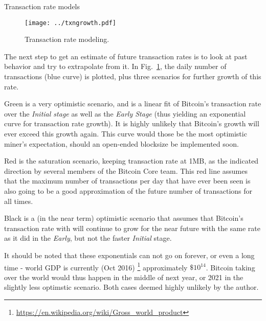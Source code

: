 \documentclass{article}
\begin{document}
\begin{section}{Transaction rate models}
  \begin{figure}[h]
    \texttt{[image: ../txngrowth.pdf]}
    \caption{Transaction rate modeling. \label{fig:txngrowth}}
  \end{figure}
  
  The next step to get an estimate of future transaction rates is to look at
  past behavior and try to extrapolate from it. In Fig.~\ref{fig:txngrowth},
  the daily number of transactions (blue curve) is plotted, plus three
  scenarios for further growth of this rate.

  Green is a very optimistic scenario, and is a linear fit of Bitcoin's
  transaction rate over the \emph{Initial stage} as well as the
  \emph{Early Stage} (thus yielding an exponential curve for transaction rate
  growth). It is highly unlikely that Bitcoin's growth will ever exceed this
  growth again. This curve would those be the most optimistic miner's
  expectation, should an open-ended blocksize be implemented soon.
  
  Red is the saturation scenario, keeping transaction rate at 1MB, as
  the indicated direction by several members of the Bitcoin Core team. This red
  line assumes that the maximum number of transactions per day that have ever
  been seen is also going to be a good approximation of the future number of
  transactions for all times.
  
  Black is a (in the near term) optimistic scenario that assumes that
  Bitcoin's transaction rate with will continue to grow for the near future
  with the same rate as it did in the \emph{Early}, but not the faster
  \emph{Initial} stage.

  It should be noted that these exponentials can not go on forever, or even a
  long time - world GDP is currently (Oct
  2016) \footnote{\url{https://en.wikipedia.org/wiki/Gross_world_product}}
  approximately $\$10^{14}$. Bitcoin taking over the world would thus happen
  in the middle of next year, or 2021 in the slightly less optimstic
  scenario. Both cases deemed highly unlikely by the author.
  
\clearpage
\end{section}
\end{document}
